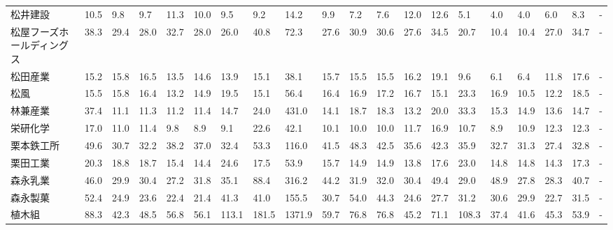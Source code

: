 \begin{tabular}{llllllllllllllllllll}
松井建設            &   10.5 &    9.8 &       9.7 &      11.3 &       10.0 &     9.5 &     9.2 &     14.2 &     9.9 &     7.2 &    7.6 &   12.0 &    12.6 &     5.1 &     4.0 &    4.0 &    6.0 &     8.3 &      - \\
松屋フーズホールディングス   &   38.3 &   29.4 &      28.0 &      32.7 &       28.0 &    26.0 &    40.8 &     72.3 &    27.6 &    30.9 &   30.6 &   27.6 &    34.5 &    20.7 &    10.4 &   10.4 &   27.0 &    34.7 &      - \\
松田産業            &   15.2 &   15.8 &      16.5 &      13.5 &       14.6 &    13.9 &    15.1 &     38.1 &    15.7 &    15.5 &   15.5 &   16.2 &    19.1 &     9.6 &     6.1 &    6.4 &   11.8 &    17.6 &      - \\
松風              &   15.5 &   15.8 &      16.4 &      13.2 &       14.9 &    19.5 &    15.1 &     56.4 &    16.4 &    16.9 &   17.2 &   16.7 &    15.1 &    23.3 &    16.9 &   10.5 &   12.2 &    18.5 &      - \\
林兼産業            &   37.4 &   11.1 &      11.3 &      11.2 &       11.4 &    14.7 &    24.0 &    431.0 &    14.1 &    18.7 &   18.3 &   13.2 &    20.0 &    33.3 &    15.3 &   14.9 &   13.6 &    14.7 &      - \\
栄研化学            &   17.0 &   11.0 &      11.4 &       9.8 &        8.9 &     9.1 &    22.6 &     42.1 &    10.1 &    10.0 &   10.0 &   11.7 &    16.9 &    10.7 &     8.9 &   10.9 &   12.3 &    12.3 &      - \\
栗本鉄工所           &   49.6 &   30.7 &      32.2 &      38.2 &       37.0 &    32.4 &    53.3 &    116.0 &    41.5 &    48.3 &   42.5 &   35.6 &    42.3 &    35.9 &    32.7 &   31.3 &   27.4 &    32.8 &      - \\
栗田工業            &   20.3 &   18.8 &      18.7 &      15.4 &       14.4 &    24.6 &    17.5 &     53.9 &    15.7 &    14.9 &   14.9 &   13.8 &    17.6 &    23.0 &    14.8 &   14.8 &   14.3 &    17.3 &      - \\
森永乳業            &   46.0 &   29.9 &      30.4 &      27.2 &       31.8 &    35.1 &    88.4 &    316.2 &    44.2 &    31.9 &   32.0 &   30.4 &    49.4 &    29.0 &    48.9 &   27.8 &   28.3 &    40.7 &      - \\
森永製菓            &   52.4 &   24.9 &      23.6 &      22.4 &       21.4 &    41.3 &    41.0 &    155.5 &    30.7 &    54.0 &   44.3 &   24.6 &    27.7 &    31.2 &    30.6 &   29.9 &   22.7 &    31.5 &      - \\
植木組             &   88.3 &   42.3 &      48.5 &      56.8 &       56.1 &   113.1 &   181.5 &   1371.9 &    59.7 &    76.8 &   76.8 &   45.2 &    71.1 &   108.3 &    37.4 &   41.6 &   45.3 &    53.9 &      - \\

\end{tabular}
